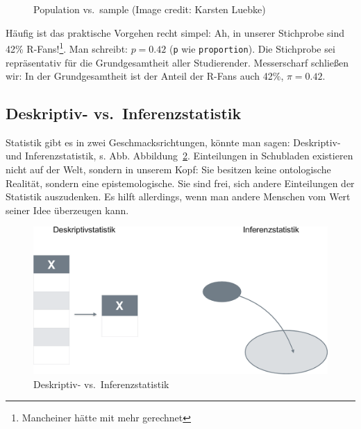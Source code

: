 \documentclass[
  a4paper,
  DIV=11]{scrreprt}
\theoremstyle{definition}
\theoremstyle{remark}
\begin{document}
\begin{figure}
\begin{minipage}[t]{0.50\linewidth}
{{}

}

\end{minipage}%

\caption{\label{fig-pop-sample}Population vs.~sample (Image credit:
Karsten Luebke)}

\end{figure}

Häufig ist das praktische Vorgehen recht simpel: Ah, in unserer
Stichprobe sind 42\% R-Fans!\footnote{Mancheiner hätte mit mehr
  gerechnet}. Man schreibt: \(p = 0.42\) (\texttt{p} wie
\texttt{proportion}). Die Stichprobe sei repräsentativ für die
Grundgesamtheit aller Studierender. Messerscharf schließen wir: In der
Grundgesamtheit ist der Anteil der R-Fans auch 42\%, \(\pi=0.42\).

\hypertarget{deskriptiv--vs.-inferenzstatistik}{%
\subsection{Deskriptiv-
vs.~Inferenzstatistik}\label{deskriptiv--vs.-inferenzstatistik}}

Statistik gibt es in zwei Geschmacksrichtungen, könnte man sagen:
Deskriptiv- und Inferenzstatistik, s. Abb. Abbildung~\ref{fig-inf1}.
Einteilungen in Schubladen existieren nicht auf der Welt, sondern in
unserem Kopf: Sie besitzen keine ontologische Realität, sondern eine
epistemologische. Sie sind frei, sich andere Einteilungen der Statistik
auszudenken. Es hilft allerdings, wenn man andere Menschen vom Wert
seiner Idee überzeugen kann.

\begin{figure}

{\centering \includegraphics{./img/desk_vs_inf-crop.png}

}

\caption{\label{fig-inf1}Deskriptiv- vs.~Inferenzstatistik}

\end{figure}
\end{document}
